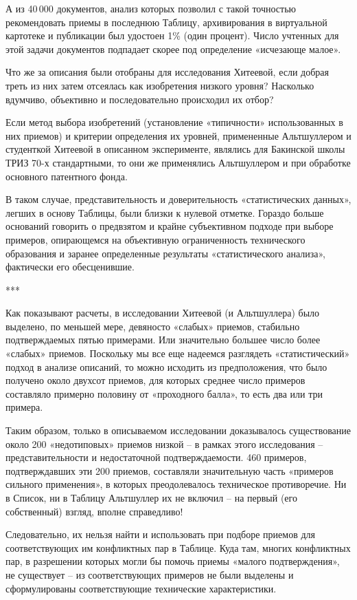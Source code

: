 \documentclass[11pt,a4paper]{article}
\begin{document}
А из 40\,000 документов, анализ которых позволил с такой точностью
рекомендовать приемы в последнюю Таблицу, архивирования в виртуальной
картотеке и публикации был удостоен 1\% (один процент). Число учтенных для
этой задачи документов подпадает скорее под определение «исчезающе малое».

Что же за описания были отобраны для исследования Хитеевой, если добрая треть
из них затем отсеялась как изобретения низкого уровня? Насколько вдумчиво,
объективно и последовательно происходил их отбор?

Если метод выбора изобретений (установление «типичности» использованных в них
приемов) и критерии определения их уровней, примененные Альтшуллером и
студенткой Хитеевой в описанном эксперименте, являлись для Бакинской школы
ТРИЗ 70-х стандартными, то они же применялись Альтшуллером и при обработке
основного патентного фонда.

В таком случае, представительность и доверительность «статистических данных»,
легших в основу Таблицы, были близки к нулевой отметке. Гораздо больше
оснований говорить о предвзятом и крайне субъективном подходе при выборе
примеров, опирающемся на объективную ограниченность технического образования и
заранее определенные результаты «статистического анализа», фактически его
обесценившие.

\begin{center}
  ***
\end{center}

Как показывают расчеты, в исследовании Хитеевой (и Альтшуллера) было выделено,
по меньшей мере, девяносто «слабых» приемов, стабильно подтверждаемых пятью
примерами. Или значительно большее число более «слабых» приемов. Поскольку мы
все еще надеемся разглядеть «статистический» подход в анализе описаний, то
можно исходить из предположения, что было получено около двухсот приемов, для
которых среднее число примеров составляло примерно половину от «проходного
балла», то есть два или три примера.

Таким образом, только в описываемом исследовании доказывалось существование
около 200 «недотиповых» приемов низкой -- в рамках этого исследования --
представительности и недостаточной подтверждаемости. 460 примеров,
подтверждавших эти 200 приемов, составляли значительную часть «примеров
сильного применения», в которых преодолевалось техническое противоречие. Ни в
Список, ни в Таблицу Альтшуллер их не включил -- на первый (его собственный)
взгляд, вполне справедливо!

Следовательно, их нельзя найти и использовать при подборе приемов для
соответствующих им конфликтных пар в Таблице. Куда там, многих конфликтных
пар, в разрешении которых могли бы помочь приемы «малого подтверждения», не
существует -- из соответствующих примеров не были выделены и сформулированы
соответствующие технические характеристики.
\end{document}
